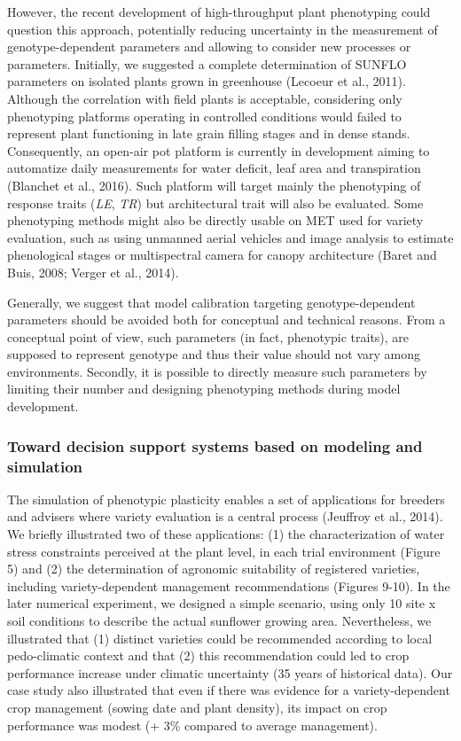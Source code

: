 \documentclass[a4paper]{article}
\begin{document}
However, the recent development of high-throughput plant phenotyping
could question this approach, potentially reducing uncertainty in the
measurement of genotype-dependent parameters and allowing to consider
new processes or parameters. Initially, we suggested a complete
determination of SUNFLO parameters on isolated plants grown in
greenhouse (Lecoeur et al., 2011). Although the correlation with field
plants is acceptable, considering only phenotyping platforms operating
in controlled conditions would failed to represent plant functioning in
late grain filling stages and in dense stands. Consequently, an open-air
pot platform is currently in development aiming to automatize daily
measurements for water deficit, leaf area and transpiration (Blanchet et
al., 2016). Such platform will target mainly the phenotyping of response
traits (\emph{LE}, \emph{TR}) but architectural trait will also be
evaluated. Some phenotyping methods might also be directly usable on MET
used for variety evaluation, such as using unmanned aerial vehicles and
image analysis to estimate phenological stages or multispectral camera
for canopy architecture (Baret and Buis, 2008; Verger et al., 2014).

Generally, we suggest that model calibration targeting
genotype-dependent parameters should be avoided both for conceptual and
technical reasons. From a conceptual point of view, such parameters (in
fact, phenotypic traits), are supposed to represent genotype and thus
their value should not vary among environments. Secondly, it is possible
to directly measure such parameters by limiting their number and
designing phenotyping methods during model development.

\subsubsection{Toward decision support systems based on modeling and
simulation}\label{toward-decision-support-systems-based-on-modeling-and-simulation}

The simulation of phenotypic plasticity enables a set of applications
for breeders and advisers where variety evaluation is a central process
(Jeuffroy et al., 2014). We briefly illustrated two of these
applications: (1) the characterization of water stress constraints
perceived at the plant level, in each trial environment (Figure 5) and
(2) the determination of agronomic suitability of registered varieties,
including variety-dependent management recommendations (Figures 9-10).
In the later numerical experiment, we designed a simple scenario, using
only 10 site x soil conditions to describe the actual sunflower growing
area. Nevertheless, we illustrated that (1) distinct varieties could be
recommended according to local pedo-climatic context and that (2) this
recommendation could led to crop performance increase under climatic
uncertainty (35 years of historical data). Our case study also
illustrated that even if there was evidence for a variety-dependent crop
management (sowing date and plant density), its impact on crop
performance was modest (+ 3\% compared to average management).
\end{document}
